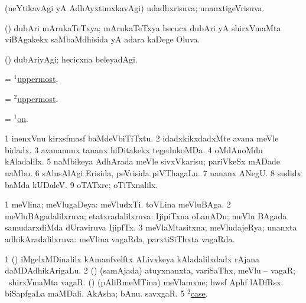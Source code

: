 \bentry
{} 
\gl{\gu}
\expl{}
\bmng
(neYtikavAgi yA AdhAyxtimxkavAgi) udadhxrisuva; unanxtigeVrisuva. 
\emng
\eentry

\bentry
{} 
\gl{\gu}
\expl{}
\bmng
(\birx) dubAri mArukaTeTxya; mArukaTeTxya hecucx dubAri yA shirxVmaMta viBAgakekx saMbaMdhisida yA adara kaDege Oluva. 
\emng
\eentry

\bentry
{} 
\gl{\kirxvi}
\expl{}
\bmng
(\birx) dubAriyAgi; hecicxna beleyadAgi. 
\emng
\eentry

\bentry
{} 
\gl{\gu}
\expl{}
\bmng
= \hyperlink{uppermost(1)}{$^1$uppermost}. 
\emng
\eentry

\bentry
{} 
\gl{\kirxvi}
\expl{}
\bmng
= \hyperlink{uppermost(2)}{$^2$uppermost}. 
\emng
\eentry

\bentry
{} 
\gl{\upa}
\expl{}
\bmng
= \hyperref{kandict_o.pdf}{O}{on(1)}{$^1$on}. 
\emng

\noindent
\gl{\pagu}
\expl{}
\bmng
\bnum
\num{1}  inenxVnu kirxsfmasf baMdeVbiTiTxtu. 
\num{2}  idadxkikxdadxMte avana meVle bidadx. 
\num{3}  avananunx tananx hiDitakekx tegedukoMDa. 
\num{4}  oMdAnoMdu kAladalilx. 
\num{5}  naMbikeya AdhArada meVle sivxVkarisu; pariVkeSx mADade naMbu. 
\num{6}  sAlusAlAgi Erisida, peVrisida piVThagaLu. 
\num{7}  nananx ANegU. 
\num{8}  sudidx baMda kUDaleV. 
\num{9}  oTATxre; oTiTxnalilx. 
\enum
\emng
\eentry

\bentry
{} 
\gl{\gu}
\expl{}
\bmng
\bnum
\num{1} meVlina; meVlugaDeya:  meVludxTi.  toVLina meVluBAga. 
\num{2} meVluBAgadalilxruva; etatxradalilxruva:  IjipiTxna oLanADu; meVlu BAgada samudarxdiMda dUraviruva IjipfTx. 
\num{3} meVlaMtasitxna; meVludajeRya; unanxta adhikAradalilxruva:  meVlina vagaRda, parxtiSiThxta vagaRda. 
\enum
\emng

\noindent
\gl{\pagu}
\expl{}
\bmng
\bnum
\num{1}  (\ca) iMgelxMDinalilx kAmanfvelftx ALivxkeya kAladalilxdadx rAjana daMDAdhikArigaLu. 
\num{2}  (\AmA) (samAjada) atuyxnanxta, variSaThx, meVlu -- vagaR; \kanmu\ shirxVmaMta vagaR. 
  (\birx) 
\banum
{} (pAliRmeMTina) meVlamxne; hwsf Aphf lADfRsx. 
 biSapfgaLa maMDali. 
\eanum
\numie
{}  
\banum
{} AkAsha; bAnu. 
 savxgaR.
\eanum
\numie
\num{5}  \hyperref{kandict_c.pdf}{C}{case(2) pagu(2)}{$^2$case}. 
\enum
\emng
\eentry

